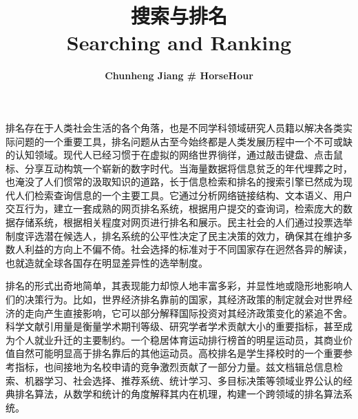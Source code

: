 \documentclass[a4paper,twoside,hyperref]{ctexbook}
\title{\color{darkred} \huge {搜索与排名 \\ Searching and Ranking}}
\author{\color{darkblue} \textbf{Chunheng Jiang \# HorseHour}}
\date{}
\begin{document}
\maketitle

排名存在于人类社会生活的各个角落，也是不同学科领域研究人员籍以解决各类实际问题的一个重要工具，排名问题从古至今始终都是人类发展历程中一个不可或缺的认知领域。现代人已经习惯于在虚拟的网络世界徜徉，通过敲击键盘、点击鼠标、分享互动构筑一个崭新的数字时代。当海量数据将信息贫乏的年代埋葬之时，也淹没了人们惯常的汲取知识的道路，长于信息检索和排名的搜索引擎已然成为现代人们检索查询信息的一个主要工具。它通过分析网络链接结构、文本语义、用户交互行为，建立一套成熟的网页排名系统，根据用户提交的查询词，检索庞大的数据存储系统，根据相关程度对网页进行排名和展示。民主社会的人们通过投票选举制度评选潜在候选人，排名系统的公平性决定了民主决策的效力，确保其在维护多数人利益的方向上不偏不倚。社会选择的标准对于不同国家存在迥然各异的解读，也就造就全球各国存在明显差异性的选举制度。

排名的形式出奇地简单，其表现能力却惊人地丰富多彩，并显性地或隐形地影响人们的决策行为。比如，世界经济排名靠前的国家，其经济政策的制定就会对世界经济的走向产生直接影响，它可以部分解释国际投资对其经济政策变化的紧追不舍。科学文献引用量是衡量学术期刊等级、研究学者学术贡献大小的重要指标，甚至成为个人就业升迁的主要制约。一个稳居体育运动排行榜首的明星运动员，其商业价值自然可能明显高于排名靠后的其他运动员。高校排名是学生择校时的一个重要参考指标，也间接地为名校申请的竞争激烈贡献了一部分力量。兹文档辑总信息检索、机器学习、社会选择、推荐系统、统计学习、多目标决策等领域业界公认的经典排名算法，从数学和统计的角度解释其内在机理，构建一个跨领域的排名算法系统。

\tableofcontents
\listoftables
\listoffigures



% 



\end{document}

